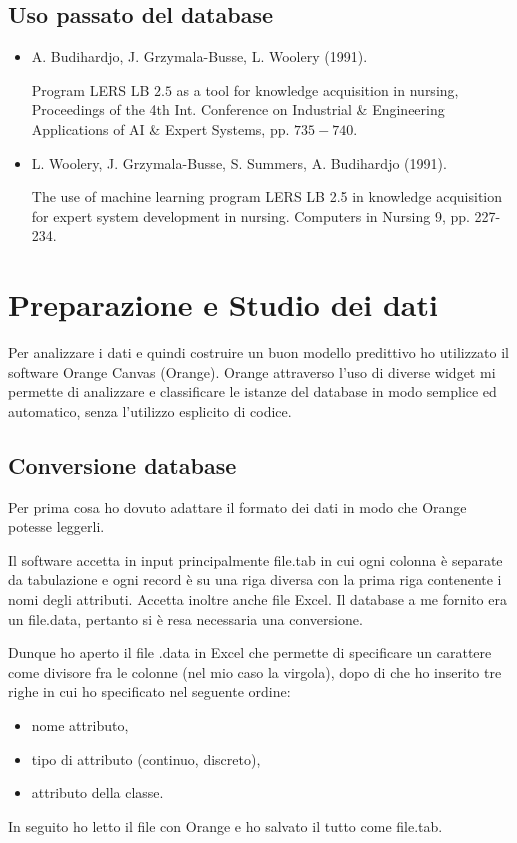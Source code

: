 \documentclass[a4paper, 12p]{report}
\begin{document}
\section{Uso passato del database}
\begin{itemize}
\item  A. Budihardjo, J. Grzymala-Busse, L. Woolery (1991). 

Program LERS LB $2.5$ as a tool for knowledge acquisition in nursing, Proceedings of the 4th Int. Conference on Industrial \& Engineering Applications of AI \& Expert Systems, pp. $735-740.$
\item L. Woolery, J. Grzymala-Busse, S. Summers, A. Budihardjo (1991). 

The use of machine learning program LERS LB 2.5 in knowledge acquisition for expert system development in nursing. Computers in Nursing 9, pp. 227-234.			
\end{itemize}
\chapter{Preparazione e Studio dei dati}
Per analizzare i dati e quindi costruire un buon modello predittivo ho utilizzato il software Orange Canvas (Orange). 
Orange attraverso l'uso di diverse widget mi permette di analizzare e classificare le istanze del database in modo semplice ed automatico, senza l'utilizzo esplicito di codice. 

\section{Conversione database}
\noindent Per prima cosa ho dovuto adattare il formato dei dati in modo che Orange potesse leggerli. 

\noindent Il software accetta in input principalmente file.tab in cui ogni colonna è separate da tabulazione e ogni record è su una riga diversa con la prima riga contenente i nomi degli attributi. Accetta inoltre anche file Excel. 
Il database a me fornito era un file.data, pertanto si è resa necessaria una conversione.

\noindent Dunque ho aperto il file .data in Excel che permette di specificare un carattere come divisore fra le colonne (nel mio caso la virgola), dopo di che ho inserito tre righe in cui ho specificato nel seguente ordine:
\begin{itemize}
\item nome attributo,
\item tipo di attributo (continuo, discreto),
\item attributo della classe. 
\end{itemize}
\noindent In seguito ho letto il file con Orange e ho salvato il tutto come file.tab.
\end{document}
